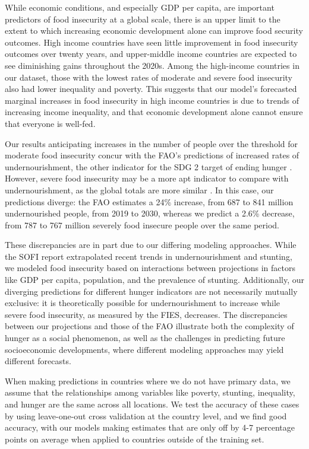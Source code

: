 \documentclass{article}
\begin{document}
While economic conditions, and especially GDP per capita, are important predictors of food insecurity at a global scale, there is an upper limit to the extent to which increasing economic development alone can improve food security outcomes.  High income countries have seen little improvement in food insecurity outcomes over twenty years, and upper-middle income countries are expected to see diminishing gains throughout the 2020s.  Among the high-income countries in our dataset, those with the lowest rates of moderate and severe food insecurity also had lower inequality and poverty.  This suggests that our model's forecasted marginal increases in food insecurity in high income countries is due to trends of increasing income inequality, and that economic development alone cannot ensure that everyone is well-fed.

Our results anticipating increases in the number of people over the threshold for moderate food insecurity concur with the FAO's predictions of increased rates of undernourishment, the other indicator for the SDG 2 target of ending hunger \citep[Part 1, Page 11]{sofi2020}.  However, severe food insecurity may be a more apt indicator to compare with undernourishment, as the global totals are more similar \citep{sofi2020}.  In this case, our predictions diverge: the FAO estimates a 24\% increase, from 687 to 841 million undernourished people, from 2019 to 2030, whereas we predict a 2.6\% decrease, from 787 to 767 million severely food insecure people over the same period.

These discrepancies are in part due to our differing modeling approaches. While the SOFI report extrapolated recent trends in undernourishment and stunting, we modeled food insecurity based on interactions between projections in factors like GDP per capita, population, and the prevalence of stunting. Additionally, our diverging predictions for different hunger indicators are not necessarily mutually exclusive: it is theoretically possible for undernourishment to increase while severe food insecurity, as measured by the FIES, decreases.  The discrepancies between our projections and those of the FAO illustrate both the complexity of hunger as a social phenomenon, as well as the challenges in predicting future socioeconomic developments, where different modeling approaches may yield different forecasts.

When making predictions in countries where we do not have primary data, we assume that the relationships among variables like poverty, stunting, inequality, and hunger are the same across all locations.  We test the accuracy of these cases by using leave-one-out cross validation at the country level, and we find good accuracy, with our models making estimates that are only off by 4-7 percentage points on average when applied to countries outside of the training set. 
\end{document}
